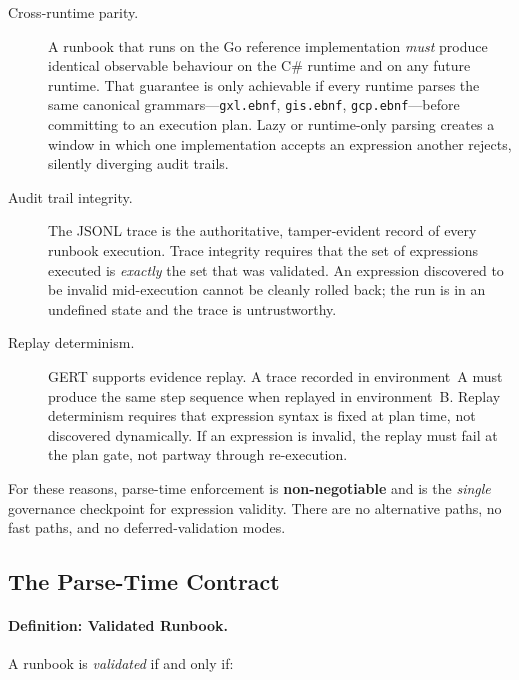 \begin{description}
  \item[Cross-runtime parity.]
    A runbook that runs on the Go reference implementation
    \emph{must} produce identical observable behaviour on the C\# runtime and
    on any future runtime.  That guarantee is only achievable if every runtime
    parses the same canonical grammars---\texttt{gxl.ebnf},
    \texttt{gis.ebnf}, \texttt{gcp.ebnf}---before committing to an execution
    plan.  Lazy or runtime-only parsing creates a window in which one
    implementation accepts an expression another rejects, silently diverging
    audit trails.

  \item[Audit trail integrity.]
    The JSONL trace is the authoritative, tamper-evident record of every
    runbook execution.  Trace integrity requires that the set of expressions
    executed is \emph{exactly} the set that was validated.  An expression
    discovered to be invalid mid-execution cannot be cleanly rolled back; the
    run is in an undefined state and the trace is untrustworthy.

  \item[Replay determinism.]
    GERT supports evidence replay.  A trace recorded in environment~A must
    produce the same step sequence when replayed in environment~B.  Replay
    determinism requires that expression syntax is fixed at plan time, not
    discovered dynamically.  If an expression is invalid, the replay must fail
    at the plan gate, not partway through re-execution.
\end{description}

For these reasons, parse-time enforcement is \textbf{non-negotiable} and is the
\emph{single} governance checkpoint for expression validity.  There are no
alternative paths, no fast paths, and no deferred-validation modes.

\subsection{The Parse-Time Contract}
\label{sec:parse-gate:contract}

\paragraph{Definition: Validated Runbook.}
A runbook is \emph{validated} if and only if:

